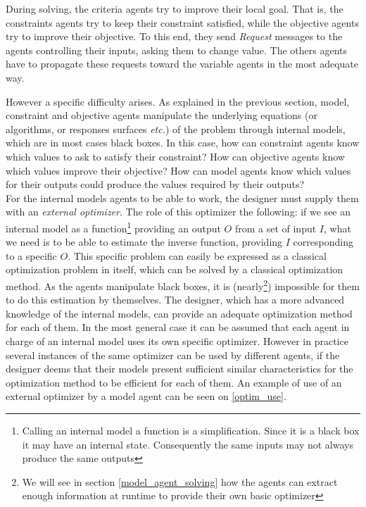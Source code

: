 During solving, the criteria agents try to improve their local goal. That is, the constraints agents try to keep their constraint satisfied, while the objective agents try to improve their objective. To this end, they send \emph{Request} messages to the agents controlling their inputs, asking them to change value. The others agents have to propagate these requests toward the variable agents in the most adequate way.

However a specific difficulty arises. As explained in the previous section, model, constraint and objective agents manipulate the underlying equations (or algorithms, or responses surfaces \emph{etc.}) of the problem through internal models, which are in most cases black boxes. In this case, how can constraint agents know which values to ask to satisfy their constraint? How can objective agents know which values improve their objective? How can model agents know which values for their outputs could produce the values required by their outputs?\\
For the internal models agents to be able to work, the designer must supply them with an \emph{external optimizer}. The role of this optimizer the following: if we see an internal model as a function\footnote{Calling an internal model a function is a simplification. Since it is a black box it may have an internal state. Consequently the same inputs may not always produce the same outputs} providing an output $O$ from a set of input $I$, what we need is to be able to estimate the inverse function, providing $I$ corresponding to a specific $O$. This specific problem can easily be expressed as a classical optimization problem in itself, which can be solved by a classical optimization method. As the agents manipulate black boxes, it is (nearly\footnote{We will see in section \ref{model_agent_solving} how the agents can extract enough information at runtime to provide their own basic optimizer}) impossible for them to do this estimation by themselves. The designer, which has a more advanced knowledge of the internal models, can provide an adequate optimization method for each of them. In the most general case it can be assumed that each agent in charge of an internal model uses its own specific optimizer. However in practice several instances of the same optimizer can be used by different agents, if the designer deems that their models present sufficient similar characteristics for the optimization method to be efficient for each of them. An example of use of an external optimizer by a model agent can be seen on \figurename{} \ref{optim_use}.

